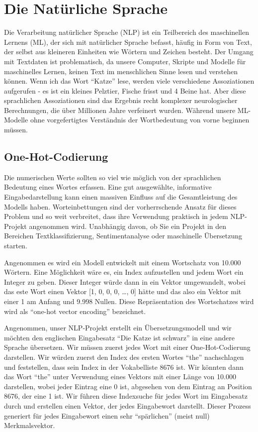 \chapter{Die Natürliche Sprache}
Die Verarbeitung natürlicher Sprache (NLP) ist ein Teilbereich des maschinellen Lernens (ML), der sich mit natürlicher Sprache befasst, häufig in Form von Text, der selbst aus kleineren Einheiten wie Wörtern und Zeichen besteht. Der Umgang mit Textdaten ist problematisch, da unsere Computer, Skripte und Modelle für maschinelles Lernen, keinen Text im menschlichen Sinne lesen und verstehen können.
Wenn ich das Wort \enquote{Katze} lese, werden viele verschiedene Assoziationen aufgerufen - es ist ein kleines Pelztier, Fische frisst und 4 Beine hat. Aber diese sprachlichen Assoziationen sind das Ergebnis recht komplexer neurologischer Berechnungen, die über Millionen Jahre verfeinert wurden. Während unsere ML-Modelle ohne vorgefertigtes Verständnis der Wortbedeutung von vorne beginnen müssen.

\section{One-Hot-Codierung}
Die numerischen Werte sollten so viel wie möglich von der sprachlichen Bedeutung eines Wortes erfassen. Eine gut ausgewählte, informative Eingabedarstellung kann einen massiven Einfluss auf die Gesamtleistung des Modells haben. Worteinbettungen sind der vorherrschende Ansatz für dieses Problem und so weit verbreitet, dass ihre Verwendung praktisch in jedem NLP-Projekt angenommen wird. Unabhängig davon, ob Sie ein Projekt in den Bereichen Textklassifizierung, Sentimentanalyse oder maschinelle Übersetzung starten.

Angenommen es wird ein Modell entwickelt mit einem Wortschatz von 10.000 Wörtern. Eine Möglichkeit wäre es, ein Index aufzustellen und jedem Wort ein Integer zu geben. Dieser Integer würde dann in ein Vektor umgewandelt, wobei das este Wort einen Vektor [1, 0, 0, 0, …, 0] hätte und das also ein Vektor mit einer 1 am Anfang und  9.998 Nullen. Diese Repräsentation des Wortschatzes wird  wird als \enquote{one-hot vector encoding} bezeichnet.

Angenommen, unser NLP-Projekt erstellt ein Übersetzungsmodell und wir möchten den englischen Eingabesatz \enquote{Die Katze ist schwarz} in eine andere Sprache übersetzen. Wir müssen zuerst jedes Wort mit einer One-Hot-Codierung darstellen. Wir würden zuerst den Index des ersten Wortes \enquote{the} nachschlagen und feststellen, dass sein Index in der Vokabelliste 8676 ist. Wir könnten dann das Wort \enquote{the} unter Verwendung eines Vektors mit einer Länge von 10.000 darstellen, wobei jeder Eintrag eine 0 ist, abgesehen von dem Eintrag an Position 8676, der eine 1 ist. Wir führen diese Indexsuche für jedes Wort im Eingabesatz durch und erstellen einen Vektor, der jedes Eingabewort darstellt. Dieser Prozess generiert für jedes Eingabewort einen sehr \enquote{spärlichen} (meist null) Merkmalsvektor.

